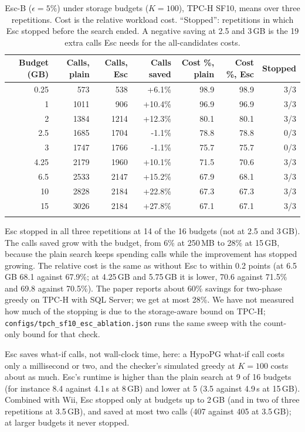 \begin{table}[h]\centering\small
\begin{tabular}{rrrrrrr}\toprule
Budget (GB) & Calls, plain & Calls, Esc & Calls saved & Cost \%, plain & Cost \%, Esc & Stopped\\\midrule
0.25 & 573 & 538 & +6.1\% & 98.9 & 98.9 & 3/3\\
1 & 1011 & 906 & +10.4\% & 96.9 & 96.9 & 3/3\\
2 & 1384 & 1214 & +12.3\% & 80.1 & 80.1 & 3/3\\
2.5 & 1685 & 1704 & -1.1\% & 78.8 & 78.8 & 0/3\\
3 & 1747 & 1766 & -1.1\% & 75.7 & 75.7 & 0/3\\
4.25 & 2179 & 1960 & +10.1\% & 71.5 & 70.6 & 3/3\\
6.5 & 2533 & 2147 & +15.2\% & 67.9 & 68.1 & 3/3\\
10 & 2828 & 2184 & +22.8\% & 67.3 & 67.3 & 3/3\\
15 & 3026 & 2184 & +27.8\% & 67.1 & 67.1 & 3/3\\\\\bottomrule
\end{tabular}
\caption{Esc-B ($\epsilon=5\%$) under storage budgets ($K=100$), TPC-H SF10, means over three repetitions. Cost is the relative workload cost. ``Stopped'': repetitions in which Esc stopped before the search ended. A negative saving at 2.5 and 3\,GB is the 19 extra calls Esc needs for the all-candidates costs.}\label{tab:escstorage}
\end{table}

Esc stopped in all three repetitions at 14 of the 16 budgets (not at 2.5 and 3\,GB). The calls saved grow with the budget, from 6\% at 250\,MB to 28\% at 15\,GB, because the plain search keeps spending calls while the improvement has stopped growing. The relative cost is the same as without Esc to within 0.2 points (at 6.5\,GB 68.1 against 67.9\%; at 4.25\,GB and 5.75\,GB it is lower, 70.6 against 71.5\% and 69.8 against 70.5\%). The paper reports about 60\% savings for two-phase greedy on TPC-H with SQL Server; we get at most 28\%. We have not measured how much of the stopping is due to the storage-aware bound on TPC-H; \texttt{configs/tpch\_sf10\_esc\_ablation.json} runs the same sweep with the count-only bound for that check.

Esc saves what-if calls, not wall-clock time, here: a HypoPG what-if call costs only a millisecond or two, and the checker's simulated greedy at $K=100$ costs about as much. Esc's runtime is higher than the plain search at 9 of 16 budgets (for instance 8.4 against 4.1\,s at 8\,GB) and lower at 5 (3.5 against 4.9\,s at 15\,GB). Combined with Wii, Esc stopped only at budgets up to 2\,GB (and in two of three repetitions at 3.5\,GB), and saved at most two calls (407 against 405 at 3.5\,GB); at larger budgets it never stopped.

